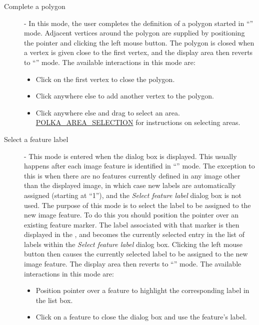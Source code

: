 \begin{description}
\begin{itemize}
\end{itemize}

\item [\mylabel{POLKA_MODE_2} Complete a polygon] - In this mode, the
user completes the definition of a polygon started in ``'' mode. Adjacent vertices around the
polygon are supplied by positioning the pointer and clicking the left
mouse button. The polygon is closed when a vertex is given close to the
first vertex, and the display area then reverts to ``'' mode. The available interactions in 
this mode are:

\begin{itemize}
\item Click on the first vertex to close the polygon.
\item Click anywhere else to add another vertex to the polygon.
\item Click anywhere else and drag to select an area. \hyperref{Go here}{See
section }{}{POLKA_AREA_SELECTION} for instructions on selecting areas.
\end{itemize}

\item [\mylabel{POLKA_MODE_3} Select a feature label] - This mode is
entered when the 
dialog box is displayed. This usually happens after each image feature is
identified in ``'' mode. The
exception to this is when there are no features currently defined in any
image other than the displayed image, in which case new labels are
automatically assigned (starting at ``1''), and the {\em Select feature
label} dialog box is not used. The purpose of this mode is to select the
label to be assigned to the new image feature. To do this you should
position the pointer over an existing feature marker. The label
associated with that marker is then displayed in the , and becomes the currently selected entry in
the list of labels within the {\em Select feature label} dialog box.
Clicking the left mouse button then causes the currently selected label
to be assigned to the new image feature. The display area then reverts to
``'' mode. 
The available interactions in this mode are:

\begin{itemize}
\item Position pointer over a feature to highlight the corresponding label 
in the list box.
\item Click on a feature to close the dialog box and use the feature's label.
\end{itemize}


\end{description}
